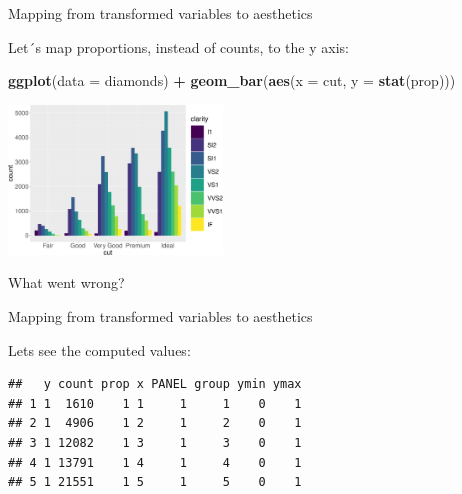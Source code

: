 \documentclass[ignorenonframetext,]{beamer}
\newenvironment{Shaded}{\begin{snugshade}}{\end{snugshade}}
\newcommand{\DataTypeTok}[1]{\textcolor[rgb]{0.13,0.29,0.53}{#1}}
\newcommand{\DecValTok}[1]{\textcolor[rgb]{0.00,0.00,0.81}{#1}}
\newcommand{\KeywordTok}[1]{\textcolor[rgb]{0.13,0.29,0.53}{\textbf{#1}}}
\newcommand{\NormalTok}[1]{#1}
\newcommand{\OperatorTok}[1]{\textcolor[rgb]{0.81,0.36,0.00}{\textbf{#1}}}
\newcommand{\StringTok}[1]{\textcolor[rgb]{0.31,0.60,0.02}{#1}}
\begin{document}
\begin{frame}[fragile]{Mapping from transformed variables to aesthetics}
\protect\hypertarget{mapping-from-transformed-variables-to-aesthetics-1}{}

Let´s map proportions, instead of counts, to the y axis:

\begin{Shaded}
\begin{Highlighting}[]
\KeywordTok{ggplot}\NormalTok{(}\DataTypeTok{data =}\NormalTok{ diamonds) }\OperatorTok{+}
\StringTok{  }\KeywordTok{geom_bar}\NormalTok{(}\KeywordTok{aes}\NormalTok{(}\DataTypeTok{x =}\NormalTok{ cut, }\DataTypeTok{y =} \KeywordTok{stat}\NormalTok{(prop)))}
\end{Highlighting}
\end{Shaded}

\begin{center}\includegraphics[height=150px]{data-visualization_files/figure-beamer/unnamed-chunk-128-1} \end{center}

What went wrong?

\end{frame}

\begin{frame}[fragile]{Mapping from transformed variables to aesthetics}
\protect\hypertarget{mapping-from-transformed-variables-to-aesthetics-2}{}

Lets see the computed values:

\begin{Shaded}
\end{Shaded}

\begin{verbatim}
##   y count prop x PANEL group ymin ymax
## 1 1  1610    1 1     1     1    0    1
## 2 1  4906    1 2     1     2    0    1
## 3 1 12082    1 3     1     3    0    1
## 4 1 13791    1 4     1     4    0    1
## 5 1 21551    1 5     1     5    0    1
\end{verbatim}

\end{frame}
\end{document}
